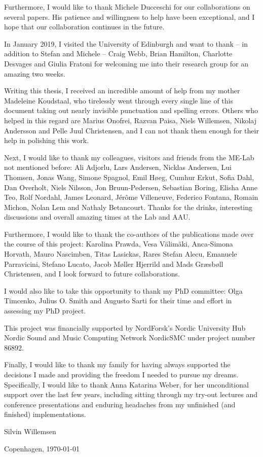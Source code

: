 Furthermore, I would like to thank Michele Ducceschi for our collaborations on several papers. His patience and willingness to help have been exceptional, and I hope that our collaboration continues in the future.

In January 2019, I visited the University of Edinburgh and want to thank -- in addition to Stefan and Michele -- Craig Webb, Brian Hamilton, Charlotte Desvages and Giulia Fratoni for welcoming me into their research group for an amazing two weeks. 

Writing this thesis, I received an incredible amount of help from my mother Madeleine Koudstaal, who tirelessly went through every single line of this document taking out nearly invisible punctuation and spelling errors. Others who helped in this regard are Marius Onofrei, Razvan Paisa, Niels Willemsen, Nikolaj Andersson and Pelle Juul Christensen, and I can not thank them enough for their help in polishing this work.

Next, I would like to thank my colleagues, visitors and friends from the ME-Lab not mentioned before: Ali Adjorlu, Lars Andersen, Nicklas Andersen, Lui Thomsen, Jonas Wang, Simone Spagnol, Emil H{\o}eg, Cumhur Erkut, Sofia Dahl, Dan Overholt, Niels Nilsson, Jon Bruun-Pedersen, Sebastian Boring, Elisha Anne Teo, Rolf Nordahl, James Leonard, J{\'e}r{\^o}me Villeneuve, Federico Fontana, Romain Michon, Nolan Lem and Nathaly Betancourt. Thanks for the drinks, interesting discussions and overall amazing times at the Lab and AAU.

Furthermore, I would like to thank the co-authors of the publications made over the course of this project: Karolina Prawda, Vesa V{\"a}lim{\"a}ki, Anca-Simona Horvath, Mauro Nascimben, Titas Lasickas, Rares Stefan Alecu, Emanuele Parravicini, Stefano Lucato, Jacob M{\o}ller Hjerrild and Mads Græsbøll Christensen, and I look forward to future collaborations. 

I would also like to take this opportunity to thank my PhD committee: Olga Timcenko, Julius O. Smith and Augusto Sarti for their time and effort in assessing my PhD project.

This project was financially supported by NordForsk's Nordic University Hub Nordic Sound and Music Computing Network NordicSMC under project number 86892.

Finally, I would like to thank my family for having always supported the decisions I made and providing the freedom I needed to pursue my dreams. Specifically, I would like to thank Anna Katarina Weber, for her unconditional support over the last few years, including sitting through my try-out lectures and conference presentations and enduring headaches from my unfinished (and finished) implementations.

\vfill
\hfill Silvin Willemsen

\hfill Copenhagen, \today
